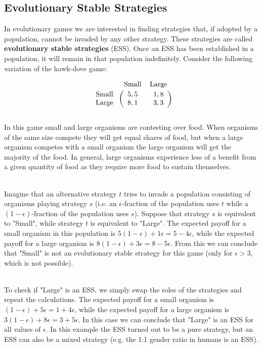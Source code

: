 \documentclass[12pt]{article}
\begin{document}
\subsection{Evolutionary Stable Strategies}
In evolutionary games we are interested in finding strategies that, if adopted by a population, cannot be invaded by any other strategy.
These strategies are called \textbf{evolutionary stable strategies} (ESS).
Once an ESS has been established in a population, it will remain in that population indefinitely.
Consider the following variation of the hawk-dove game:

\[ \begin{blockarray}{ccc}
    & \text{Small} & \text{Large} \\[0.5ex]
    \begin{block}{r(cc)}
        \text{Small } & 5, 5 & 1, 8 \\
        \text{Large } & 8, 1 & 3, 3 \\
    \end{block}
\end{blockarray} \]

\noindent
In this game small and large organisms are contesting over food.
When organisms of the same size compete they will get equal shares of food, but when a large organism competes with a small organism the large organism will get the majority of the food.
In general, large organisms experience less of a benefit from a given quantity of food as they require more food to sustain themselves.

\noindent
\\
Imagine that an alternative strategy $t$ tries to invade a population consisting of organisms playing strategy $s$ (i.e. an $\epsilon$-fraction of the population uses $t$ while a $(1 - \epsilon)$-fraction of the population uses $s$).
Suppose that strategy $s$ is equivalent to "Small", while strategy $t$ is equivalent to "Large".
The expected payoff for a small organism in this population is $5 (1 - \epsilon) + 1\epsilon = 5 - 4\epsilon$, while the expected payoff for a large organism is $8(1 - \epsilon) + 3\epsilon = 8 - 5\epsilon$.
From this we can conclude that "Small" is not an evolutionary stable strategy for this game (only for $\epsilon > 3$, which is not possible).

\noindent
\\
To check if "Large" is an ESS, we simply swap the roles of the strategies and repeat the calculations.
The expected payoff for a small organism is $(1 - \epsilon) + 5\epsilon = 1 + 4\epsilon$, while the expected payoff for a large organism is $3(1 - \epsilon) + 8\epsilon = 3 + 5\epsilon$.
In this case we can conclude that "Large" is an ESS for all values of $\epsilon$.
In this example the ESS turned out to be a pure strategy, but an ESS can also be a mixed strategy (e.g. the 1:1 gender ratio in humans is an ESS).
\end{document}
